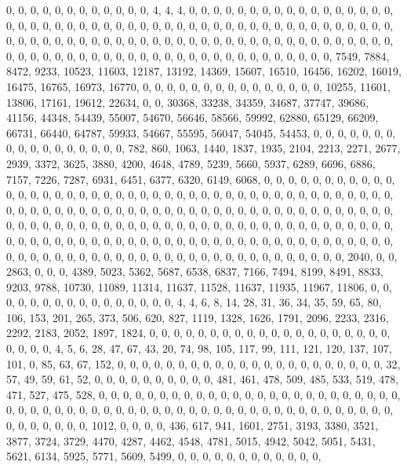 \documentclass[
]{article}
\begin{document}
0, 0, 0, 0, 0, 0, 0, 0, 0, 0, 0, 0, 4, 4, 4, 0, 0, 0, 0, 0, 0, 0, 0, 0,
0, 0, 0, 0, 0, 0, 0, 0, 0, 0, 0, 0, 0, 0, 0, 0, 0, 0, 0, 0, 0, 0, 0, 0,
0, 0, 0, 0, 0, 0, 0, 0, 0, 0, 0, 0, 0, 0, 0, 0, 0, 0, 0, 0, 0, 0, 0, 0,
0, 0, 0, 0, 0, 0, 0, 0, 0, 0, 0, 0, 0, 0, 0, 0, 0, 0, 0, 0, 0, 0, 0, 0,
0, 0, 0, 0, 0, 0, 0, 0, 0, 0, 0, 0, 0, 0, 0, 0, 0, 0, 0, 0, 0, 0, 0, 0,
0, 0, 0, 7549, 7884, 8472, 9233, 10523, 11603, 12187, 13192, 14369,
15607, 16510, 16456, 16202, 16019, 16475, 16765, 16973, 16770, 0, 0, 0,
0, 0, 0, 0, 0, 0, 0, 0, 0, 0, 0, 0, 10255, 11601, 13806, 17161, 19612,
22634, 0, 0, 30368, 33238, 34359, 34687, 37747, 39686, 41156, 44348,
54439, 55007, 54670, 56646, 58566, 59992, 62880, 65129, 66209, 66731,
66440, 64787, 59933, 54667, 55595, 56047, 54045, 54453, 0, 0, 0, 0, 0,
0, 0, 0, 0, 0, 0, 0, 0, 0, 0, 0, 0, 782, 860, 1063, 1440, 1837, 1935,
2104, 2213, 2271, 2677, 2939, 3372, 3625, 3880, 4200, 4648, 4789, 5239,
5660, 5937, 6289, 6696, 6886, 7157, 7226, 7287, 6931, 6451, 6377, 6320,
6149, 6068, 0, 0, 0, 0, 0, 0, 0, 0, 0, 0, 0, 0, 0, 0, 0, 0, 0, 0, 0, 0,
0, 0, 0, 0, 0, 0, 0, 0, 0, 0, 0, 0, 0, 0, 0, 0, 0, 0, 0, 0, 0, 0, 0, 0,
0, 0, 0, 0, 0, 0, 0, 0, 0, 0, 0, 0, 0, 0, 0, 0, 0, 0, 0, 0, 0, 0, 0, 0,
0, 0, 0, 0, 0, 0, 0, 0, 0, 0, 0, 0, 0, 0, 0, 0, 0, 0, 0, 0, 0, 0, 0, 0,
0, 0, 0, 0, 0, 0, 0, 0, 0, 0, 0, 0, 0, 0, 0, 0, 0, 0, 0, 0, 0, 0, 0, 0,
0, 0, 0, 0, 0, 0, 0, 0, 0, 0, 0, 0, 0, 0, 0, 0, 0, 0, 0, 0, 0, 0, 0, 0,
0, 0, 0, 0, 0, 0, 0, 0, 0, 0, 0, 0, 0, 0, 0, 0, 0, 0, 0, 0, 0, 0, 0, 0,
0, 0, 0, 2040, 0, 0, 2863, 0, 0, 0, 4389, 5023, 5362, 5687, 6538, 6837,
7166, 7494, 8199, 8491, 8833, 9203, 9788, 10730, 11089, 11314, 11637,
11528, 11637, 11935, 11967, 11806, 0, 0, 0, 0, 0, 0, 0, 0, 0, 0, 0, 0,
0, 0, 0, 0, 4, 4, 6, 8, 14, 28, 31, 36, 34, 35, 59, 65, 80, 106, 153,
201, 265, 373, 506, 620, 827, 1119, 1328, 1626, 1791, 2096, 2233, 2316,
2292, 2183, 2052, 1897, 1824, 0, 0, 0, 0, 0, 0, 0, 0, 0, 0, 0, 0, 0, 0,
0, 0, 0, 0, 0, 0, 0, 0, 0, 0, 4, 5, 6, 28, 47, 67, 43, 20, 74, 98, 105,
117, 99, 111, 121, 120, 137, 107, 101, 0, 85, 63, 67, 152, 0, 0, 0, 0,
0, 0, 0, 0, 0, 0, 0, 0, 0, 0, 0, 0, 0, 0, 0, 0, 0, 0, 32, 57, 49, 59,
61, 52, 0, 0, 0, 0, 0, 0, 0, 0, 0, 0, 481, 461, 478, 509, 485, 533, 519,
478, 471, 527, 475, 528, 0, 0, 0, 0, 0, 0, 0, 0, 0, 0, 0, 0, 0, 0, 0, 0,
0, 0, 0, 0, 0, 0, 0, 0, 0, 0, 0, 0, 0, 0, 0, 0, 0, 0, 0, 0, 0, 0, 0, 0,
0, 0, 0, 0, 0, 0, 0, 0, 0, 0, 0, 0, 0, 0, 0, 0, 0, 0, 0, 0, 0, 0, 0, 0,
1012, 0, 0, 0, 0, 436, 617, 941, 1601, 2751, 3193, 3380, 3521, 3877,
3724, 3729, 4470, 4287, 4462, 4548, 4781, 5015, 4942, 5042, 5051, 5431,
5621, 6134, 5925, 5771, 5609, 5499, 0, 0, 0, 0, 0, 0, 0, 0, 0, 0, 0, 0,
\end{document}
